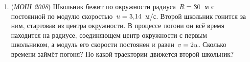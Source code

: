 \documentclass[../main.tex]{subfiles}
\begin{document}
\begin{enumerate}[wide=0pt]
  \item (\textit{МОШ 2008}) Школьник бежит по окружности радиуса~$R \hm= 30$~м с
  постоянной по модулю скоростью~$u \hm= 3{,}14$~м/с. Второй школьник гонится за ним,
  стартовав из центра окружности. В процессе погони он всё время находится на
  радиусе, соединяющем центр окружности с первым школьником, а модуль его скорости
  постоянен и равен~$v \hm= 2u$. Сколько времени займёт погоня? По какой траектории
  движется второй школьник?
\end{enumerate}
\end{document}
